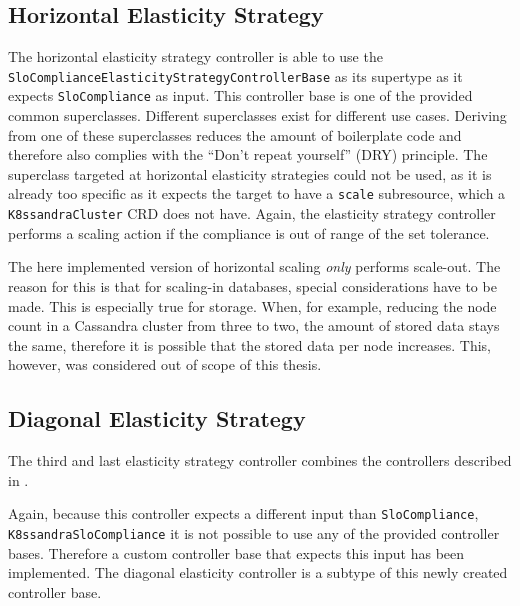 \subsection{Horizontal Elasticity Strategy}
\label{sec:horizontal-elasticity}

The horizontal elasticity strategy controller is able to use the \texttt{Slo\-Compliance\-E\-las\-tic\-i\-ty\-Strategy\-Controller\-Base} as its supertype as it expects \texttt{Slo\-Compliance} as input. This controller base is one of the provided common superclasses. Different superclasses exist for different use cases. Deriving from one of these superclasses reduces the amount of boilerplate code and therefore also complies with the ``Don't repeat yourself'' (DRY) principle. The superclass targeted at horizontal elasticity strategies could not be used, as it is already too specific as it expects the target to have a \texttt{scale} subresource, which a \texttt{K8ssandraCluster} CRD does not have. Again, the elasticity strategy controller performs a scaling action if the compliance is out of range of the set tolerance.

The here implemented version of horizontal scaling \textit{only} performs scale-out. The reason for this is that for scaling-in databases, special considerations have to be made. This is especially true for storage. When, for example, reducing the node count in a Cassandra cluster from three to two, the amount of stored data stays the same, therefore it is possible that the stored data per node increases. This, however, was considered out of scope of this thesis.

\subsection{Diagonal Elasticity Strategy}
\label{sec:diagonal-elasticity}

The third and last elasticity strategy controller combines the controllers described in .

Again, because this controller expects a different input than \texttt{SloCompliance}, \texttt{K8\-ssan\-dra\-Slo\-Compliance} it is not possible to use any of the provided controller bases. Therefore a custom controller base that expects this input has been implemented. The diagonal elasticity controller is a subtype of this newly created controller base.

